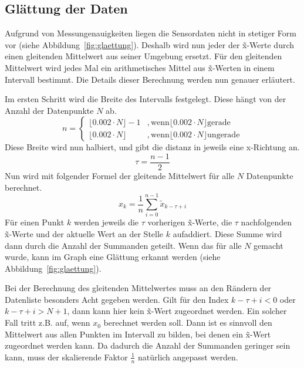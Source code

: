 \subsection{Glättung der Daten}\label{subsec:glaettung}
Aufgrund von Messungenauigkeiten liegen die Sensordaten nicht in stetiger Form vor (siehe Abbildung~\ref{fig:glaettung}).
Deshalb wird nun jeder der \~x-Werte durch einen gleitenden Mittelwert aus seiner Umgebung ersetzt.
Für den gleitenden Mittelwert wird jedes Mal ein arithmetisches Mittel aus \~x-Werten in einem Intervall bestimmt.
Die Details dieser Berechnung werden nun genauer erläutert.

Im ersten Schritt wird die Breite des Intervalls festgelegt.
Diese hängt von der Anzahl der Datenpunkte $N$ ab.
\[
    n =
    \begin{cases}
        \lfloor0.002 \cdot N \rfloor - 1 & , \text{wenn} \lfloor0.002 \cdot N \rfloor \text{gerade} \\
        \lfloor0.002 \cdot N \rfloor     & , \text{wenn} \lfloor0.002 \cdot N \rfloor \text{ungerade}
    \end{cases}
\]
Diese Breite wird nun halbiert, und gibt die distanz in jeweils eine x-Richtung an.
\[
    \tau = \frac{n - 1}{2}
\]
Nun wird mit folgender Formel der gleitende Mittelwert für alle $N$ Datenpunkte berechnet.
\[
    x_k = \frac{1}{n} \sum_{i = 0}^{n - 1} \tilde{x}_{k-\tau+i}
\]
Für einen Punkt $k$ werden jeweils die $\tau$ vorherigen \~x-Werte, die $\tau$ nachfolgenden \~x-Werte und der aktuelle Wert an der Stelle $k$ aufaddiert.
Diese Summe wird dann durch die Anzahl der Summanden geteilt.
Wenn das für alle $N$ gemacht wurde, kann im Graph eine Glättung erkannt werden (siehe Abbildung~\ref{fig:glaettung}).

Bei der Berechnung des gleitenden Mittelwertes muss an den Rändern der Datenliste besonders Acht gegeben werden.
Gilt für den Index $k-\tau+i < 0$ oder $k-\tau+i > N + 1$, dann kann hier kein \~x-Wert zugeordnet werden.
Ein solcher Fall tritt z.B. auf, wenn $x_0$ berechnet werden soll.
Dann ist es sinnvoll den Mittelwert aus allen Punkten im Intervall zu bilden, bei denen ein \~x-Wert zugeordnet werden kann.
Da dadurch die Anzahl der Summanden geringer sein kann, muss der skalierende Faktor $\frac{1}{n}$ natürlich angepasst werden.


